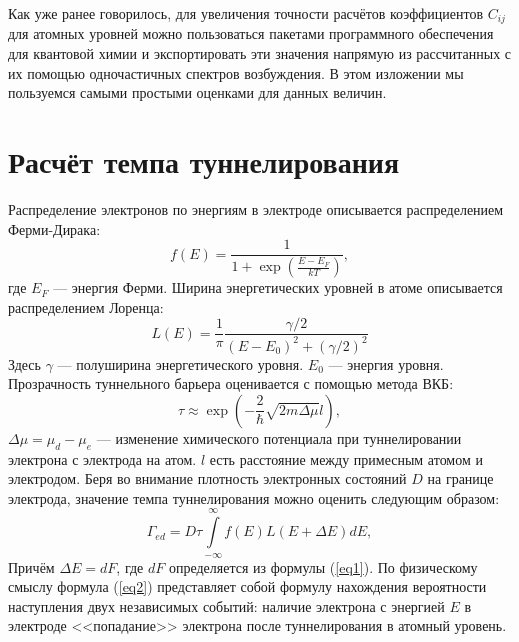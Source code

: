 \documentclass[12pt,a4paper]{report}
\begin{document}
Как уже ранее говорилось, для увеличения точности расчётов коэффициентов $C_{ij}$ для атомных уровней можно пользоваться пакетами программного обеспечения для квантовой химии и экспортировать эти значения напрямую из рассчитанных с их помощью одночастичных спектров возбуждения. В этом изложении мы пользуемся самыми простыми оценками для данных величин. 
\section{Расчёт темпа туннелирования}
Распределение электронов по энергиям в электроде описывается
распределением Ферми-Дирака:
\begin{equation}
f(E)= \frac{1}{1+\exp(\frac{E-E_F}{kT})},
\end{equation}
где $E_F$ — энергия Ферми.
Ширина энергетических уровней в атоме описывается распределением Лоренца:
\begin{equation}
L(E)=\frac{1}{\pi}\frac{\gamma/2}{(E-E_0)^2+(\gamma/2)^2}
\end{equation}
Здесь $\gamma$ — полуширина энергетического уровня. $E_0$ — энергия уровня. Прозрачность туннельного барьера оценивается с помощью метода ВКБ:
\begin{equation}
\tau \approx \exp(-\frac{2}{\hbar}\sqrt{2m\Delta\mu}l),
\end{equation}
$\Delta\mu = \mu_d - \mu_e$ — изменение химического потенциала при туннелировании электрона с электрода на атом. $l$ есть расстояние между примесным атомом и электродом. Беря во внимание плотность электронных состояний $D$ на границе электрода, значение темпа туннелирования можно оценить следующим образом:
\begin{equation}\label{eq2}
\Gamma_{ed} = D\tau \int\limits_{-\infty}^{\infty}f(E)L(E + \Delta E) dE,
\end{equation} 
Причём $\Delta E = dF$, где $dF$ определяется из формулы (\ref{eq1}).
По физическому смыслу формула (\ref{eq2}) представляет собой формулу нахождения вероятности наступления двух независимых событий: наличие электрона с энергией $E$ в электроде <<попадание>> электрона после туннелирования в атомный уровень.
\end{document}
